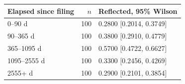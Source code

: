 \begin{tabular}{@{}lrl@{}}
\toprule
Elapsed since filing & $n$ & Reflected, 95\% Wilson \\
\midrule
0--90 d & 100 & 0.2800 [0.2014, 0.3749] \\
90--365 d & 100 & 0.3800 [0.2910, 0.4779] \\
365--1095 d & 100 & 0.5700 [0.4722, 0.6627] \\
1095--2555 d & 100 & 0.3300 [0.2456, 0.4269] \\
2555+ d & 100 & 0.2900 [0.2101, 0.3854] \\
\bottomrule
\end{tabular}
